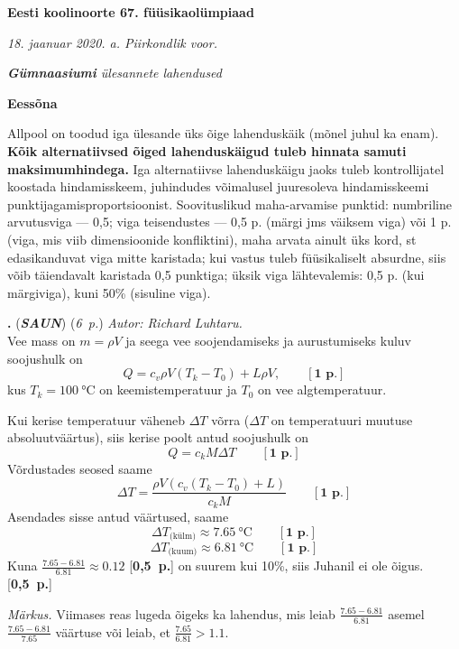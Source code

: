 \documentclass[12pt,a5paper]{article}
\newcommand{\numb}[1]{\vspace{5pt}\textbf{\large #1}}
\newcommand{\nimi}[1]{(\textsl{\small #1})}
\newcommand{\punktid}[1]{(\emph{#1~p.})}
\newcounter{ylesanne}
\newcommand{\yl}[1]{\addtocounter{ylesanne}{1}\numb{\theylesanne.} \nimi{\bf{#1}} \newblock{}}
\newcommand{\pp}[1]{[\textbf{#1~p.}]}
\newcommand{\autor}[1]{\emph{ Autor: #1.\\}}
\begin{document}
\begin{center}
\textbf{\Large Eesti koolinoorte 67. füüsikaolümpiaad} \vspace{2pt}

\emph{18. jaanuar 2020. a. Piirkondlik voor.}

\emph{{\bf Gümnaasiumi} ülesannete lahendused}


\end{center}

\numb{Eessõna}

Allpool on toodud iga ülesande üks õige lahenduskäik (mõnel juhul ka
enam). \textbf{Kõik alternatiivsed õiged lahenduskäigud tuleb hinnata samuti maksimumhindega.} Iga alternatiivse lahenduskäigu jaoks tuleb
kontrollijatel koostada hindamisskeem, juhindudes võimalusel juuresoleva
hindamisskeemi punktijagamisproportsioonist. Soovituslikud
maha-arvamise punktid: numbriline arvutusviga --- 0,5; viga
teisendustes --- 0,5 p. (märgi jms väiksem viga) või 1 p. (viga, mis
viib dimensioonide konf\/liktini), maha arvata ainult üks kord, st
edasikanduvat viga mitte karistada; kui vastus tuleb füüsikaliselt
absurdne, siis võib täiendavalt karistada 0,5 punktiga; üksik viga
lähtevalemis: 0,5 p. (kui märgiviga), kuni 50\% (sisuline viga).


\yl{SAUN} \punktid{6} \autor{Richard Luhtaru}
Vee mass on $m=\rho V$ ja seega vee soojendamiseks ja aurustumiseks kuluv soojushulk on
$$Q=c_v\rho V (T_k-T_0) + L\rho V, \qquad\pp{1}$$
kus $T_k = \SI{100}{\celsius}$ on keemistemperatuur ja $T_0$ on vee algtemperatuur.

Kui kerise temperatuur väheneb $\Delta T$ võrra ($\Delta T$ on temperatuuri muutuse absoluutväärtus), siis kerise poolt antud soojushulk on
$$Q=c_kM\Delta T \qquad \pp{1}$$
Võrdustades seosed saame
$$\Delta T = \frac{\rho V\left(c_v(T_k-T_0)+L\right)}{c_kM} \qquad\pp{1}$$
Asendades sisse antud väärtused, saame
$$\Delta T_{\text{(külm)}}\approx \SI{7.65}{\celsius} \qquad\pp{1}$$
$$\Delta T_{\text{(kuum)}}\approx \SI{6.81}{\celsius} \qquad\pp{1}$$
Kuna $\frac{\num{7.65}-\num{6.81}}{\num{6.81}}\approx \num{0.12}$ \pp{0,5} on suurem kui 10\%, siis Juhanil ei ole õigus. \pp{0,5}

\emph{Märkus.} Viimases reas lugeda õigeks ka lahendus, mis leiab $\frac{\num{7.65}-\num{6.81}}{\num{6.81}}$ asemel $\frac{\num{7.65}-\num{6.81}}{\num{7.65}}$ väärtuse või leiab, et $\frac{\num{7.65}}{\num{6.81}}>\num{1.1}$.
\end{document}
